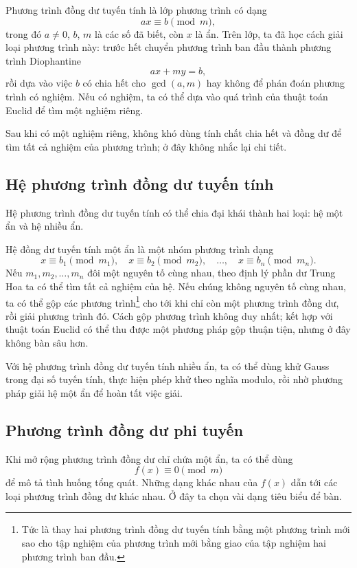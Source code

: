 \documentclass[11pt]{article}
\begin{document}
Phương trình đồng dư tuyến tính là lớp phương trình có dạng
\[
  ax \equiv b \pmod m,
\]
trong đó $a\ne 0$, $b$, $m$ là các số đã biết, còn $x$ là ẩn. Trên lớp, ta đã
học cách giải loại phương trình này: trước hết chuyển phương trình ban đầu
thành phương trình Diophantine
\[
  ax+my=b,
\]
rồi dựa vào việc $b$ có chia hết cho $\gcd(a,m)$ hay không để phán đoán
phương trình có nghiệm. Nếu có nghiệm, ta có thể dựa vào quá trình của thuật
toán Euclid để tìm một nghiệm riêng.

Sau khi có một nghiệm riêng, không khó dùng tính chất chia hết và đồng dư để
tìm tất cả nghiệm của phương trình; ở đây không nhắc lại chi tiết.

\subsection{Hệ phương trình đồng dư tuyến tính}

Hệ phương trình đồng dư tuyến tính có thể chia đại khái thành hai loại: hệ
một ẩn và hệ nhiều ẩn.

Hệ đồng dư tuyến tính một ẩn là một nhóm phương trình dạng
\[
  x\equiv b_1 \pmod {m_1},\quad
  x\equiv b_2 \pmod {m_2},\quad \ldots,\quad
  x\equiv b_n \pmod {m_n}.
\]
Nếu $m_1,m_2,\ldots,m_n$ đôi một nguyên tố cùng nhau, theo định lý phần dư
Trung Hoa ta có thể tìm tất cả nghiệm của hệ. Nếu chúng không nguyên tố cùng
nhau, ta có thể gộp các phương trình\footnote{Tức là thay hai phương trình
đồng dư tuyến tính bằng một phương trình mới sao cho tập nghiệm của phương
trình mới bằng giao của tập nghiệm hai phương trình ban đầu.} cho tới khi chỉ
còn một phương trình đồng dư, rồi giải phương trình đó. Cách gộp phương trình
không duy nhất; kết hợp với thuật toán Euclid có thể thu được một phương pháp
gộp thuận tiện, nhưng ở đây không bàn sâu hơn.

Với hệ phương trình đồng dư tuyến tính nhiều ẩn, ta có thể dùng khử Gauss
trong đại số tuyến tính, thực hiện phép khử theo nghĩa modulo, rồi nhờ phương
pháp giải hệ một ẩn để hoàn tất việc giải.

\subsection{Phương trình đồng dư phi tuyến}

Khi mở rộng phương trình đồng dư chỉ chứa một ẩn, ta có thể dùng
\[
  f(x)\equiv 0 \pmod m
\]
để mô tả tình huống tổng quát. Những dạng khác nhau của $f(x)$ dẫn tới các
loại phương trình đồng dư khác nhau. Ở đây ta chọn vài dạng tiêu biểu để bàn.
\end{document}
